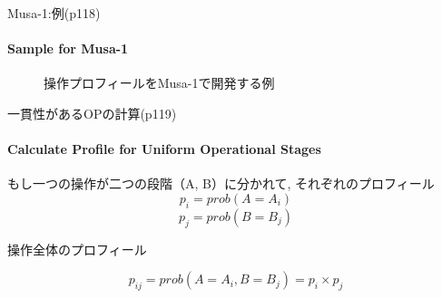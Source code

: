 \begin{frame}{Musa-1:例(p118)}
\framesubtitle{Sample for Musa-1}
\begin{figure}
\caption{操作プロフィールをMusa-1で開発する例}
\end{figure}
\end{frame}
\begin{frame}{一貫性があるOPの計算(p119)}
\framesubtitle{Calculate Profile for Uniform Operational Stages}
もし一つの操作が二つの段階（A, B）に分かれて, それぞれのプロフィール
\[p_i=prob(A=A_i)\]
\[p_j=prob(B=B_j)\]

操作全体のプロフィール

\[p_{ij}=prob(A=A_i,B=B_j)=p_i \times p_j\]
\end{frame}
